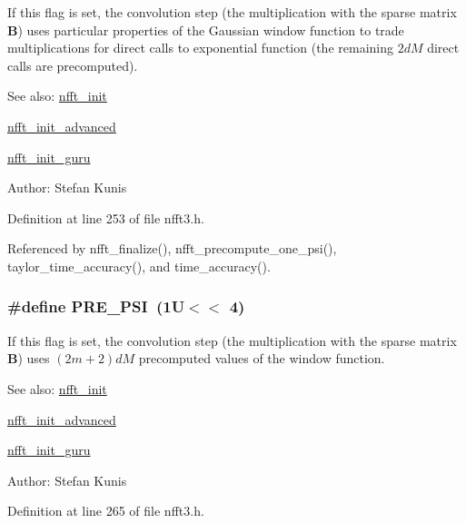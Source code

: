 If this flag is set, the convolution step (the multiplication with the sparse matrix $\mathbf{B}$) uses particular properties of the Gaussian window function to trade multiplications for direct calls to exponential function (the remaining $2dM$ direct calls are precomputed). 

\begin{Desc}
\item[See also:]\hyperlink{group__nfft_g1dfeaf18f3735f035afa62ca768d99c4}{nfft\_\-init} 

\hyperlink{group__nfft_gcd4a22fd1f6ea476a57759a90510d114}{nfft\_\-init\_\-advanced} 

\hyperlink{group__nfft_g406f05717c6299b918261c61aaa9de23}{nfft\_\-init\_\-guru} \end{Desc}
\begin{Desc}
\item[Author:]Stefan Kunis \end{Desc}


Definition at line 253 of file nfft3.h.

Referenced by nfft\_\-finalize(), nfft\_\-precompute\_\-one\_\-psi(), taylor\_\-time\_\-accuracy(), and time\_\-accuracy().\hypertarget{group__nfft_g959463a5c7723ccef5057ddcb784b40c}{
\subsubsection{\setlength{\rightskip}{0pt plus 5cm}\#define PRE\_\-PSI~(1U$<$$<$ 4)}}
\label{group__nfft_g959463a5c7723ccef5057ddcb784b40c}


If this flag is set, the convolution step (the multiplication with the sparse matrix $\mathbf{B}$) uses $(2m+2)dM$ precomputed values of the window function. 

\begin{Desc}
\item[See also:]\hyperlink{group__nfft_g1dfeaf18f3735f035afa62ca768d99c4}{nfft\_\-init} 

\hyperlink{group__nfft_gcd4a22fd1f6ea476a57759a90510d114}{nfft\_\-init\_\-advanced} 

\hyperlink{group__nfft_g406f05717c6299b918261c61aaa9de23}{nfft\_\-init\_\-guru} \end{Desc}
\begin{Desc}
\item[Author:]Stefan Kunis \end{Desc}


Definition at line 265 of file nfft3.h.

